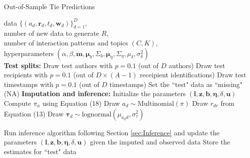 \documentclass{article}
\begin{document}
\begin{algorithm}[H]
	\caption{Out-of-Sample Tie Predictions}
	\label{alg:PPE}
	\begin{algorithmic}
		 data $ \{ (a_d, \boldsymbol{r}_d, t_d,  \boldsymbol{w}_d)\}_{d=1}^D$, \\
		number of new data to generate $R$,\\
			number of interaction patterns and topics $(C, K)$,\\
			hyperparameters $(\alpha, \beta, \boldsymbol{m}, \boldsymbol{\mu}_b, \Sigma_b, \boldsymbol{\mu}_\eta, \Sigma_\eta, {\mu}_\delta,\sigma^2_\delta)$\\
			\vskip 0.1in
		\textbf{Test splits:}	
		\STATE Draw test authors with $p=0.1$ (out of $D$ authors) 
		\STATE Draw test recipients with $p=0.1$ (out of $D\times (A-1)$ receipient identifications)
		\STATE Draw test timestamps with $p=0.1$  (out of $D$ timestamps) 
		\STATE Set the ``test" data as ``missing" (NA)
		\vskip 0.1in
				\textbf{Imputation and inference:}	
		\STATE Initialize the parameters $(\boldsymbol{l}, \boldsymbol{z}, \boldsymbol{b}, \boldsymbol{\eta},\delta, \boldsymbol{u})$
		\STATE Compute $\pi_{a} $ using Equation (18)
		\ENDFOR
		\STATE Draw $a_d \sim \mbox{Multinomial}(\pi)$
		\ENDIF
			\STATE Draw $r_{dr}$ from Equation (13)
			\ENDIF
				\ENDFOR
 	\STATE Draw $\boldsymbol{\tau}_d \sim \mbox{lognormal}(\mu_{a_dd}, \sigma^2_\tau)$
 	\ENDIF
			
	\vskip 0.1in		
	\STATE Run inference algorithm following Section \ref{sec:Inference} and update the parameters $(\boldsymbol{l}, \boldsymbol{z}, \boldsymbol{b}, \boldsymbol{\eta},\delta, \boldsymbol{u})$ given the imputed and observed data
		\ENDFOR
		\STATE Store the estimates for ``test" data
				\ENDFOR
		\end{algorithmic}
\end{algorithm}
\end{document}
